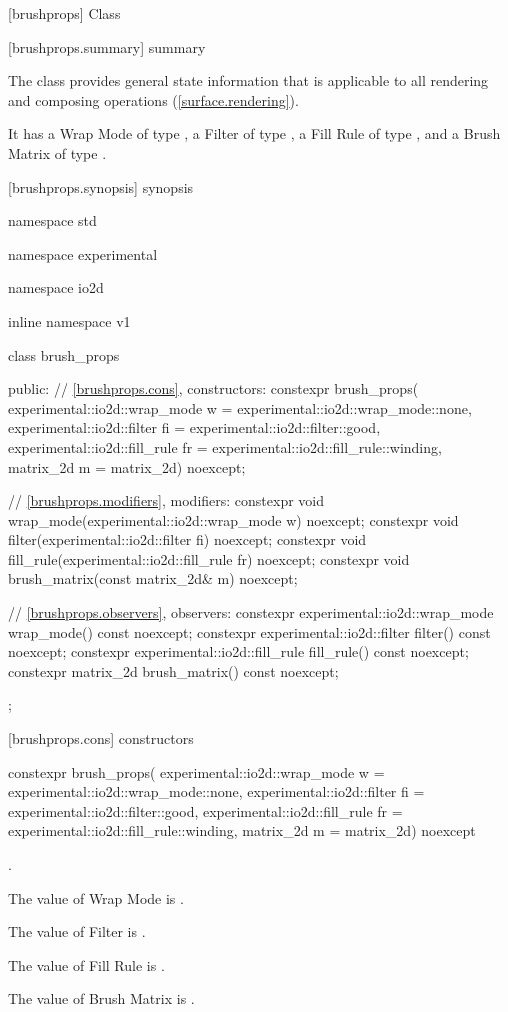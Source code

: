 
 [brushprops] {Class }

 [brushprops.summary] { summary}

\pnum
The  class provides general state information that is applicable to all rendering and composing operations (\ref{surface.rendering}).

\pnum
It has a Wrap Mode of type , a Filter of type , a Fill Rule of type , and a Brush Matrix of type .

 [brushprops.synopsis] { synopsis}

\begin{codeblock}
namespace std { namespace experimental { namespace io2d { inline namespace v1 {
  class brush_props {
  public:
    // \ref{brushprops.cons}, constructors:
    constexpr brush_props(
      experimental::io2d::wrap_mode w = experimental::io2d::wrap_mode::none,
      experimental::io2d::filter fi = experimental::io2d::filter::good,
      experimental::io2d::fill_rule fr = experimental::io2d::fill_rule::winding,
      matrix_2d m = matrix_2d{}) noexcept;

    // \ref{brushprops.modifiers}, modifiers:
    constexpr void wrap_mode(experimental::io2d::wrap_mode w) noexcept;
    constexpr void filter(experimental::io2d::filter fi) noexcept;
    constexpr void fill_rule(experimental::io2d::fill_rule fr) noexcept;
    constexpr void brush_matrix(const matrix_2d& m) noexcept;

    // \ref{brushprops.observers}, observers:
    constexpr experimental::io2d::wrap_mode wrap_mode() const noexcept;
    constexpr experimental::io2d::filter filter() const noexcept;
    constexpr experimental::io2d::fill_rule fill_rule() const noexcept;
    constexpr matrix_2d brush_matrix() const noexcept;
  };
}}}}
\end{codeblock}

 [brushprops.cons] { constructors}

\begin{itemdecl}
constexpr brush_props(
  experimental::io2d::wrap_mode w = experimental::io2d::wrap_mode::none,
  experimental::io2d::filter fi = experimental::io2d::filter::good,
  experimental::io2d::fill_rule fr = experimental::io2d::fill_rule::winding,
  matrix_2d m = matrix_2d{}) noexcept    
\end{itemdecl}
\begin{itemdescr}
\onecolumn
\requires
{}.

\pnum
\effects
The value of Wrap Mode is .

\pnum
The value of Filter is .

\pnum
The value of Fill Rule is .

\pnum
The value of Brush Matrix is .
\end{itemdescr}

